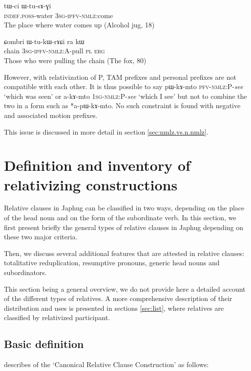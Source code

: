 \documentclass[oldfontcommands,oneside,a4paper,11pt]{article}
\newcommand{\ipa}[1]{{\phon #1}} %
\begin{document}
 \begin{exe}
\ex \label{ex:WtusAGi}
\gll
\ipa{tɯ-ci}  	\ipa{ɯ-tu-sɤ-ɣi}  \\
\textsc{indef.poss}-water \textsc{3sg-ipfv-nmlz}:come \\
\glt  The place where water comes up (Alcohol jug, 18)
 \end{exe}
 \begin{exe}
\ex \label{ex:WtukWrACi}
\gll 
\ipa{ɕombri}  	\ipa{ɯ-tu-kɯ-rɤɕi}  	\ipa{ra}  	\ipa{kɯ}  \\
chain \textsc{3sg-ipfv-nmlz:A}-pull \textsc{pl} \textsc{erg} \\
\glt Those who were pulling the chain (The fox, 80)
 \end{exe}

However, with relativization of P, TAM prefixes and personal prefixes are not compatible with each other. It is thus possible to say \ipa{pɯ-kɤ-mto} \textsc{pfv-nmlz:P}-\textit{see} `which was seen' or \ipa{a-kɤ-mto} \textsc{1sg-nmlz:P}-\textit{see} `which I see' but not to combine the two in a form such as *\ipa{a-pɯ-kɤ-mto}. No such constraint is found with negative and associated motion prefixes. 


This issue is discussed in more detail in section \ref{sec:nmlz.vs.n.nmlz}.
  
\section{Definition and inventory of relativizing constructions}

Relative clauses in Japhug can be classified in two ways, depending on the place of the head noun and on the form of the subordinate verb. In this section, we first present briefly the general types of relative clauses in Japhug depending on these two major criteria. 

Then, we discuss several additional features that are attested in relative clauses: totalitative reduplication, resumptive pronouns, generic head nouns and subordinators.

This section being a general overview, we do not provide here a detailed account of the different types of relatives. A more comprehensive description of their distribution and uses is presented in sections \ref{sec:list}, where relatives are classified by relativized participant.

\subsection{Basic definition}
 \citet[314]{dixon10basic2}  describes of the `Canonical Relative Clause Construction' as follows:
 
\end{document}
